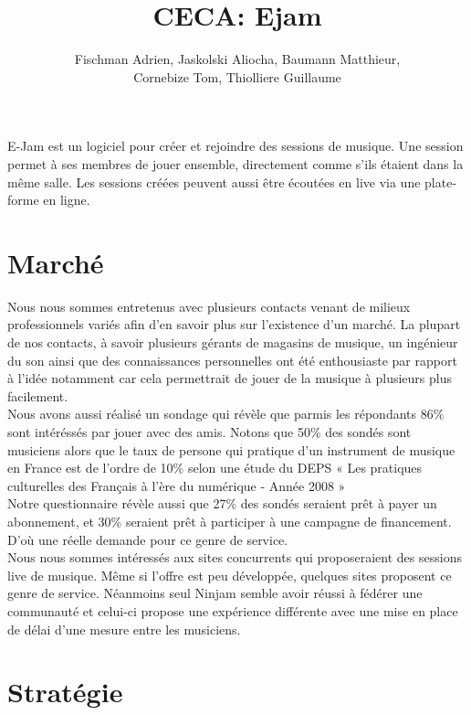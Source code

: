 \documentclass[a4,12pt]{article}
\title{CECA: Ejam}
\author{Fischman Adrien, Jaskolski Aliocha, Baumann Matthieur,\\ Cornebize Tom, Thiolliere Guillaume}
\begin{document}
\maketitle

E-Jam est un logiciel pour créer et rejoindre des sessions de musique. Une session permet à ses membres de jouer ensemble, directement comme s’ils étaient dans la même salle. Les sessions créées peuvent aussi être écoutées en live via une plate-forme en ligne.

\section{Marché}

Nous nous sommes entretenus avec plusieurs contacts venant de milieux professionnels
variés afin d’en savoir plus sur l’existence d’un marché.
La plupart de nos contacts, à savoir plusieurs gérants de magasins
de musique, un ingénieur du son ainsi que des connaissances personnelles ont été
enthousiaste par rapport à l'idée notamment car cela permettrait de jouer de la musique
à plusieurs plus facilement.
\\

Nous avons aussi réalisé un sondage qui révèle que parmis les répondants
86\% sont intéréssés par jouer avec des amis.
Notons que 50\% des sondés
sont musiciens alors que le taux de persone qui pratique d'un instrument de musique en
France est de l'ordre de 10\% selon une étude du DEPS « Les pratiques culturelles des
Français à l’ère du numérique - Année 2008 »
\\

Notre questionnaire révèle aussi que 27\% des sondés seraient prêt à payer un abonnement,
et 30\% seraient prêt à participer à une campagne de financement.
D'où une réelle demande pour ce genre de service.
\\

Nous nous sommes intéressés aux sites concurrents qui proposeraient des sessions
live de musique. Même si l’offre est peu développée, quelques sites proposent ce genre de service.
Néanmoins seul Ninjam semble avoir réussi à fédérer une communauté et celui-ci propose une expérience
différente avec une mise en place de délai d'une mesure entre les musiciens.
\\

\section{Stratégie}
\end{document}
